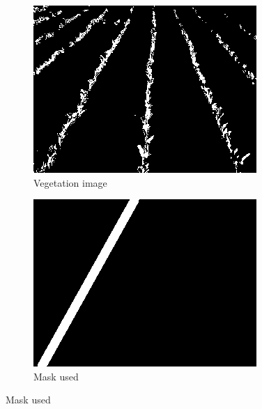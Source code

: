 \begin{figure}[H]
\centering
\begin{subfigure}{0.3\textwidth}
    \includegraphics[width=\textwidth]{Report/images/VEGSEG.png}
    \caption{Vegetation image}
    \label{fig:first}

\end{subfigure}
\begin{subfigure}{0.3\textwidth}%
    \includegraphics[width=\textwidth]{Report/images/CROPMASK.png}
    \caption{Mask used}
    \label{fig:second}


\end{subfigure}
\end{figure}
